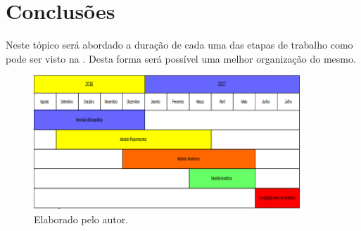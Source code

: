 \chapter{Conclusões}
Neste tópico será abordado a duração de cada uma das etapas de trabalho como pode ser visto na . Desta forma será possível uma melhor organização do mesmo.

\begin{figure}[H]
    \centering
    \includegraphics[width=10cm]{figuras/cronograma.png}
    \caption{Elaborado pelo autor.}
    \label{fig_cronograma}
\end{figure}